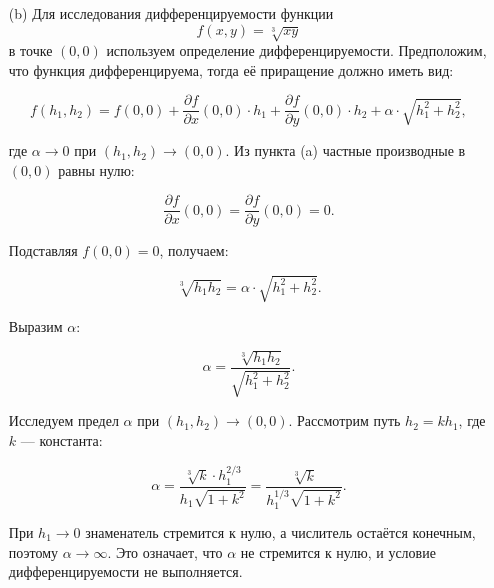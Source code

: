 \documentclass[a4paper]{article}
\begin{document}
\begin{enumerate}
\begin{enumerate}
        \item[(b)]
        Для исследования дифференцируемости функции 
        \[ f(x, y) = \sqrt[3]{xy} \] в точке \( (0, 0) \) используем определение дифференцируемости. Предположим, что функция дифференцируема, тогда её приращение должно иметь вид:
        
        \[
        f(h_1, h_2) = f(0, 0) + \frac{\partial f}{\partial x}(0, 0) \cdot h_1 + \frac{\partial f}{\partial y}(0, 0) \cdot h_2 + \alpha \cdot \sqrt{h_1^2 + h_2^2},
        \]
        
        где \( \alpha \rightarrow 0 \) при \( (h_1, h_2) \rightarrow (0, 0) \). Из пункта (a) частные производные в \( (0, 0) \) равны нулю:
        
        \[
        \frac{\partial f}{\partial x}(0, 0) = \frac{\partial f}{\partial y}(0, 0) = 0.
        \]
        
        Подставляя \( f(0, 0) = 0 \), получаем:
        
        \[
        \sqrt[3]{h_1 h_2} = \alpha \cdot \sqrt{h_1^2 + h_2^2}.
        \]
        
        Выразим \( \alpha \):
        
        \[
        \alpha = \frac{\sqrt[3]{h_1 h_2}}{\sqrt{h_1^2 + h_2^2}}.
        \]
        
        Исследуем предел \( \alpha \) при \( (h_1, h_2) \rightarrow (0, 0) \). Рассмотрим путь \( h_2 = k h_1 \), где \( k \) — константа:
        
        \[
        \alpha = \frac{\sqrt[3]{k} \cdot h_1^{2/3}}{h_1 \sqrt{1 + k^2}} = \frac{\sqrt[3]{k}}{h_1^{1/3} \sqrt{1 + k^2}}.
        \]
        
        При \( h_1 \rightarrow 0 \) знаменатель стремится к нулю, а числитель остаётся конечным, поэтому \( \alpha \rightarrow \infty \). Это означает, что \( \alpha \) не стремится к нулю, и условие дифференцируемости не выполняется.
        
    \end{enumerate}
\end{enumerate}
\end{document}
